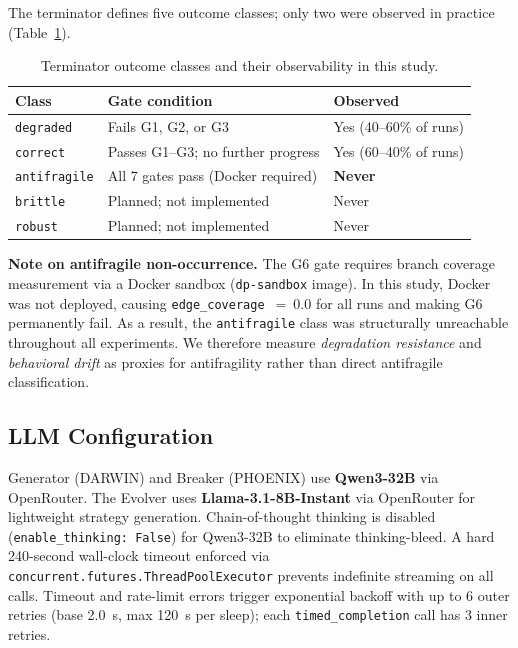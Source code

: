\documentclass[11pt,letterpaper]{article}
\begin{document}
The terminator defines five outcome classes; only two were observed in practice
(Table~\ref{tab:classes}).

\begin{table}[htbp]
\centering
\caption{Terminator outcome classes and their observability in this study.}
\label{tab:classes}
\begin{tabular}{@{}lll@{}}
\toprule
\textbf{Class} & \textbf{Gate condition} & \textbf{Observed} \\
\midrule
\texttt{degraded}    & Fails G1, G2, or G3             & Yes (40--60\% of runs) \\
\texttt{correct}     & Passes G1--G3; no further progress & Yes (60--40\% of runs) \\
\texttt{antifragile} & All 7 gates pass (Docker required) & \textbf{Never} \\
\texttt{brittle}     & Planned; not implemented         & Never \\
\texttt{robust}      & Planned; not implemented         & Never \\
\bottomrule
\end{tabular}
\end{table}

\textbf{Note on antifragile non-occurrence.}
The G6 gate requires branch coverage measurement via a Docker sandbox
(\texttt{dp-sandbox} image). In this study, Docker was not deployed, causing
\texttt{edge\_coverage}~$=~0.0$ for all runs and making G6 permanently fail. As
a result, the \texttt{antifragile} class was structurally unreachable throughout
all experiments. We therefore measure \emph{degradation resistance} and
\emph{behavioral drift} as proxies for antifragility rather than direct
antifragile classification.

\subsection{LLM Configuration}

Generator (DARWIN) and Breaker (PHOENIX) use \textbf{Qwen3-32B} via OpenRouter.
The Evolver uses \textbf{Llama-3.1-8B-Instant} via OpenRouter for lightweight
strategy generation. Chain-of-thought thinking is disabled
(\texttt{enable\_thinking: False}) for Qwen3-32B to eliminate thinking-bleed.
A hard 240-second wall-clock timeout enforced via
\texttt{concurrent.futures.ThreadPoolExecutor} prevents indefinite streaming on
all calls. Timeout and rate-limit errors trigger exponential backoff with up to
6 outer retries (base 2.0~s, max 120~s per sleep); each \texttt{timed\_completion}
call has 3 inner retries.
\end{document}
